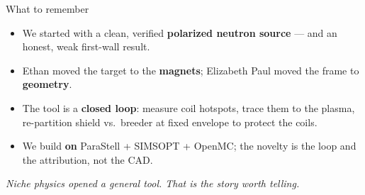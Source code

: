 \documentclass[11pt,aspectratio=169]{beamer}
\newcommand{\key}[1]{\textcolor{key}{\textbf{#1}}}
\newcommand{\qq}[1]{\begin{center}\emph{#1}\end{center}}
\begin{document}
\begin{frame}{What to remember}
\begin{itemize}
\item We started with a clean, verified \key{polarized neutron source} --- and an honest,
      weak first-wall result.
\item Ethan moved the target to the \key{magnets}; Elizabeth Paul moved the frame to
      \key{geometry}.
\item The tool is a \key{closed loop}: measure coil hotspots, trace them to the plasma,
      re-partition shield vs.\ breeder at fixed envelope to protect the coils.
\item We build \key{on} ParaStell + SIMSOPT + OpenMC; the novelty is the loop and the
      attribution, not the CAD.
\end{itemize}
\qq{Niche physics opened a general tool. That is the story worth telling.}
\end{frame}
\end{document}
